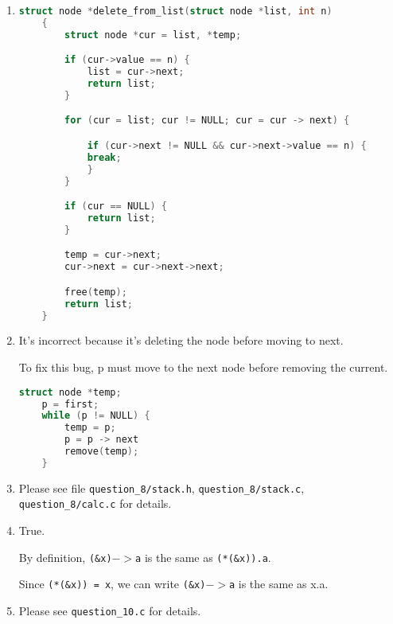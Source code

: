 \documentclass[12pt]{article}
\begin{document}
\begin{enumerate}[1.]
    \item

\begin{lstlisting}[language=c]
    struct node *delete_from_list(struct node *list, int n)
    {
        struct node *cur = list, *temp;

        if (cur->value == n) {
            list = cur->next;
            return list;
        }

        for (cur = list; cur != NULL; cur = cur -> next) {

            if (cur->next != NULL && cur->next->value == n) {
            break;
            }
        }

        if (cur == NULL) {
            return list;
        }

        temp = cur->next;
        cur->next = cur->next->next;

        free(temp);
        return list;
    }
\end{lstlisting}

    \item

    It's incorrect because it's deleting the node before moving to next.

    \bigskip

    To fix this bug, p must move to the next node before removing the current.

\begin{lstlisting}[language=c]
    struct node *temp;
    p = first;
    while (p != NULL) {
        temp = p;
        p = p -> next
        remove(temp);
    }
\end{lstlisting}

    \item

    Please see file \texttt{question\_8/stack.h}, \texttt{question\_8/stack.c},
    \texttt{question\_8/calc.c} for details.

    \item

    True.

    \bigskip

    By definition, \texttt{(\&x)$->$a} is the same as \texttt{(*(\&x)).a}.

    \bigskip

    Since \texttt{(*(\&x)) = x}, we can write \texttt{(\&x)$->$a} is the same
    as x.a.

    \item

    Please see \texttt{question\_10.c} for details.

\end{enumerate}
\end{document}
